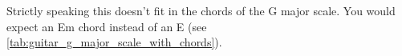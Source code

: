 Strictly speaking this doesn't fit in the chords of the G major scale. You would expect an Em chord instead of an E (see \autoref{tab:guitar_g_major_scale_with_chords}).

